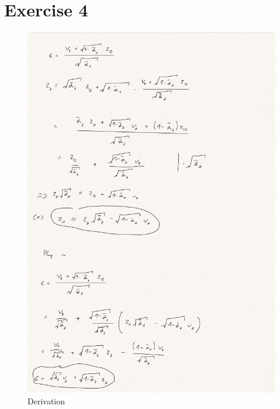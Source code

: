 \documentclass[11pt]{article}
\numberwithin{equation}{section}
\begin{document}
\section{Exercise 4}
\newpage
\begin{figure}[h]
	\caption{Derivation}
	\label{fig:derivation}
	\centering
	\includegraphics[width=1\textwidth]{report/derivation.png}%
	\end{figure}
\end{document}
